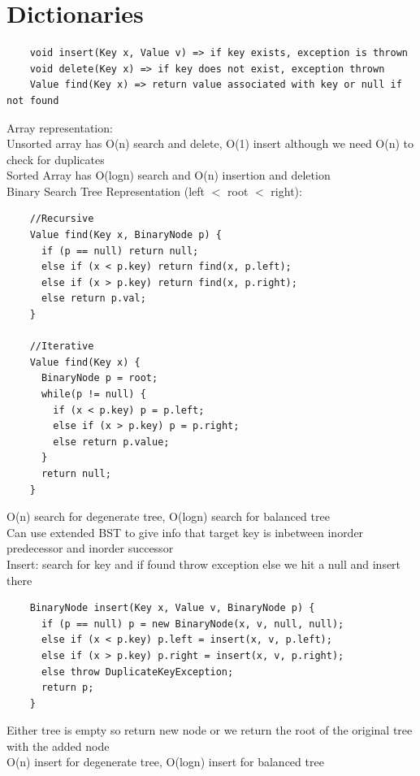 \documentclass{article}
\begin{document}
  \section{Dictionaries}
  \begin{lstlisting}
    void insert(Key x, Value v) => if key exists, exception is thrown 
    void delete(Key x) => if key does not exist, exception thrown 
    Value find(Key x) => return value associated with key or null if not found
  \end{lstlisting}
  Array representation: \\
  \indent Unsorted array has O(n) search and delete, O(1) insert although we need O(n) to check for duplicates \\
  \indent Sorted Array has O(logn) search and O(n) insertion and deletion \\
  Binary Search Tree Representation (left $<$ root $<$ right):
  \begin{lstlisting}
    //Recursive
    Value find(Key x, BinaryNode p) {
      if (p == null) return null;
      else if (x < p.key) return find(x, p.left);
      else if (x > p.key) return find(x, p.right);
      else return p.val;
    }

    //Iterative
    Value find(Key x) {
      BinaryNode p = root;
      while(p != null) {
        if (x < p.key) p = p.left;
        else if (x > p.key) p = p.right;
        else return p.value;
      }
      return null;
    }
  \end{lstlisting}
  \indent O(n) search for degenerate tree, O(logn) search for balanced tree \\
  \indent Can use extended BST to give info that target key is inbetween inorder predecessor and inorder successor \\
  \indent Insert: search for key and if found throw exception else we hit a null and insert there 
  \begin{lstlisting}
    BinaryNode insert(Key x, Value v, BinaryNode p) {
      if (p == null) p = new BinaryNode(x, v, null, null);
      else if (x < p.key) p.left = insert(x, v, p.left);
      else if (x > p.key) p.right = insert(x, v, p.right);
      else throw DuplicateKeyException;
      return p;
    }
  \end{lstlisting}
  \indent \indent Either tree is empty so return new node or we return the root of the original tree with the added node \\
  \indent O(n) insert for degenerate tree, O(logn) insert for balanced tree \\
\end{document}
